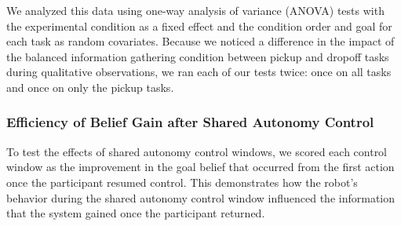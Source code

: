 \documentclass[conference]{IEEEtran}
\begin{document}
We analyzed this data using one-way analysis of variance (ANOVA) tests with the experimental condition as a fixed effect and the condition order and goal for each task as random covariates. Because we noticed a difference in the impact of the balanced information gathering condition between pickup and dropoff tasks during qualitative observations, we ran each of our tests twice: once on all tasks and once on only the pickup tasks.

\subsubsection{Efficiency of Belief Gain after Shared Autonomy Control}
To test the effects of shared autonomy control windows, we scored each control window as the improvement in the goal belief that occurred from the first action once the participant resumed control. This demonstrates how the robot's behavior during the shared autonomy control window influenced the information that the system gained once the participant returned. 

\end{document}
